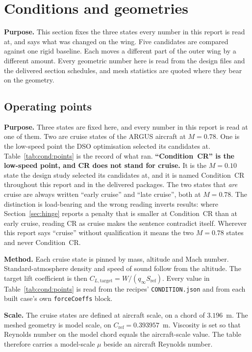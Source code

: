 \section{Conditions and geometries}
\label{sec:condgeom}
\label{sec:geom}

\textbf{Purpose.} This section fixes the three states every number in this report is read at, and
says what was changed on the wing. Five candidates are compared against one rigid baseline. Each
moves a different part of the outer wing by a different amount. Every geometric number here is
read from the design files and the delivered section schedules, and mesh statistics are quoted
where they bear on the geometry.
\subsection{Operating points}
\label{sec:cond}
\label{sec:cond:points}

\textbf{Purpose.} Three states are fixed here, and every number in this report is read at one of
them. Two are cruise states of the ARGUS aircraft at $M = 0.78$. One is the low-speed point the DSO
optimisation selected its candidates at. Table~\ref{tab:cond:points} is the record of what ran.
\textbf{``Condition~CR'' is the low-speed point, and CR does not stand for cruise.} It is the
$M = 0.10$ state the design study selected its candidates at, and it is named Condition~CR
throughout this report and in the delivered packages. The two states that \emph{are} cruise are
always written ``early cruise'' and ``late cruise'', both at $M = 0.78$. The distinction is
load-bearing and the wrong reading inverts results: where Section~\ref{sec:hinge} reports a
penalty that is smaller at Condition~CR than at early cruise, reading CR as cruise makes the
sentence contradict itself. Wherever this report says ``cruise'' without qualification it means
the two $M = 0.78$ states and never Condition~CR.

\textbf{Method.} Each cruise state is pinned by mass, altitude and Mach number. Standard-atmosphere
density and speed of sound follow from the altitude. The target lift coefficient is then
$C_{L,\mathrm{target}} = W / (q_\infty S_\mathrm{ref})$. Every value in
Table~\ref{tab:cond:points} is read from the recipes' \texttt{CONDITION.json} and from each built
case's own \texttt{forceCoeffs} block.

\textbf{Scale.} The cruise states are defined at aircraft scale, on a chord of $3.196$~m. The
meshed geometry is model scale, on $C_\mathrm{ref} = \num{0.393957}$~m. Viscosity is set so that
Reynolds number on the model chord equals the aircraft-scale value. The table therefore carries a
model-scale $\mu$ beside an aircraft Reynolds number.

